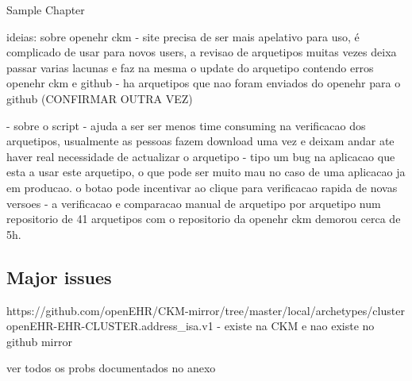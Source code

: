 \documentclass[mim_thesis.tex]{subfiles}
\begin{document}
Sample Chapter


ideias: 
sobre openehr ckm - site precisa de ser mais apelativo para uso, é complicado de usar para novos users, a revisao de arquetipos muitas vezes deixa passar varias lacunas e faz na mesma o update do arquetipo contendo erros
openehr ckm e github - ha arquetipos que nao foram enviados do openehr para o github (CONFIRMAR OUTRA VEZ) 


- sobre o script - ajuda a ser ser menos time consuming na verificacao dos arquetipos, usualmente as pessoas fazem download uma vez e deixam andar ate haver real necessidade de actualizar o arquetipo - tipo um bug na aplicacao que esta a usar este arquetipo, o que pode ser muito mau no caso de uma aplicacao ja em producao. o botao pode incentivar ao clique para verificacao rapida de novas versoes - a verificacao e comparacao manual de arquetipo por arquetipo num repositorio de 41 arquetipos com o repositorio da openehr ckm demorou cerca de 5h. 



\subsection{Major issues}

https://github.com/openEHR/CKM-mirror/tree/master/local/archetypes/cluster
openEHR-EHR-CLUSTER.address\_isa.v1 - existe na CKM e nao existe no github mirror 

ver todos os probs documentados no anexo
\end{document}
